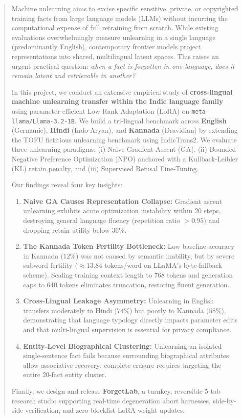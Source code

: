 \documentclass[11pt,a4paper]{article}
\begin{document}
\begin{abstract}
Machine unlearning aims to excise specific sensitive, private, or copyrighted training facts from large language models (LLMs) without incurring the computational expense of full retraining from scratch. While existing evaluations overwhelmingly measure unlearning in a single language (predominantly English), contemporary frontier models project representations into shared, multilingual latent spaces. This raises an urgent practical question: \emph{when a fact is forgotten in one language, does it remain latent and retrievable in another?} 

In this project, we conduct an extensive empirical study of \textbf{cross-lingual machine unlearning transfer within the Indic language family} using parameter-efficient Low-Rank Adaptation (LoRA) on \texttt{meta-llama/Llama-3.2-1B}. We build a tri-lingual benchmark across \textbf{English} (Germanic), \textbf{Hindi} (Indo-Aryan), and \textbf{Kannada} (Dravidian) by extending the TOFU fictitious unlearning benchmark using IndicTrans2. We evaluate three unlearning paradigms: (i) Naive Gradient Ascent (GA), (ii) Bounded Negative Preference Optimization (NPO) anchored with a Kullback-Leibler (KL) retain penalty, and (iii) Supervised Refusal Fine-Tuning.

Our findings reveal four key insights:
\begin{enumerate}
    \item \textbf{Naive GA Causes Representation Collapse:} Gradient ascent unlearning exhibits acute optimization instability within 20 steps, destroying general language fluency (repetition ratio $> 0.95$) and dropping retain utility below $36\%$.
    \item \textbf{The Kannada Token Fertility Bottleneck:} Low baseline accuracy in Kannada ($12\%$) was not caused by semantic inability, but by severe subword fertility ($\approx 13.84$ tokens/word on LLaMA's byte-fallback scheme). Scaling training context length to 768 tokens and generation caps to 640 tokens eliminates truncation, restoring fluent generation.
    \item \textbf{Cross-Lingual Leakage Asymmetry:} Unlearning in English transfers moderately to Hindi ($74\%$) but poorly to Kannada ($58\%$), demonstrating that language typology directly impacts parameter edits and that multi-lingual supervision is essential for privacy compliance.
    \item \textbf{Entity-Level Biographical Clustering:} Unlearning an isolated single-sentence fact fails because surrounding biographical attributes allow associative recovery; complete erasure requires targeting the entire 20-fact entity cluster.
\end{enumerate}
Finally, we design and release \textbf{ForgetLab}, a turnkey, reversible 5-tab research studio supporting real-time degeneration abort harnesses, side-by-side verification, and zero-blocklist LoRA weight updates.
\end{abstract}
\end{document}
